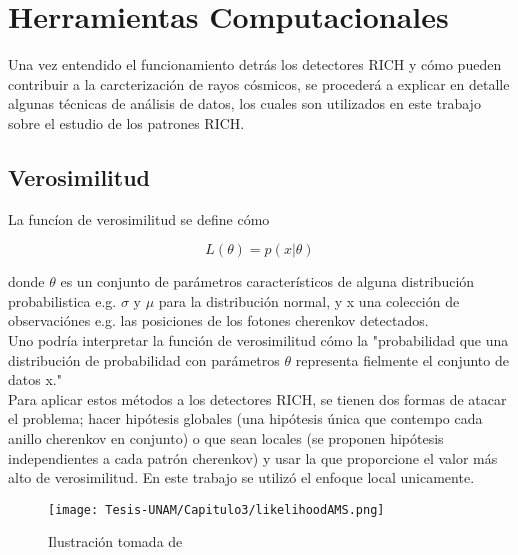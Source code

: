 

\chapter{Herramientas Computacionales}
Una vez entendido el funcionamiento detrás los detectores RICH y cómo pueden contribuir a la carcterización de rayos cósmicos, se procederá a explicar en detalle algunas técnicas de análisis de datos, los cuales son utilizados en este trabajo sobre el estudio de los patrones RICH.

\section{Verosimilitud}
La funcíon de verosimilitud se define cómo

\begin{equation}
    L(\theta) = p(x|\theta)
\end{equation}

donde $\theta$ es un conjunto de parámetros característicos de alguna distribución probabilistica e.g. $\sigma$ y $\mu$ para la distribución normal, y x una colección de observaciónes e.g. las posiciones de los fotones cherenkov detectados.\cite{likeCern}\\

 Uno podría interpretar la función de verosimilitud cómo la "probabilidad que una distribución de probabilidad con parámetros $\theta$ representa fielmente el conjunto de datos x."\\

Para aplicar estos métodos a los detectores RICH, se tienen dos formas de atacar el problema; hacer hipótesis globales (una hipótesis única que contempo cada anillo cherenkov en conjunto) o que sean locales (se proponen hipótesis independientes a cada patrón cherenkov) y usar la que proporcione el valor más alto de verosimilitud\cite{Schoning:1997eka}. En este trabajo se utilizó el enfoque local unicamente.\\

\begin{figure}
    \centering
    \texttt{[image: Tesis-UNAM/Capitulo3/likelihoodAMS.png]}
    \caption{Ilustración tomada de \cite{Ypsilantis:2003fs}}
    \label{fig:enter-label}
\end{figure}

